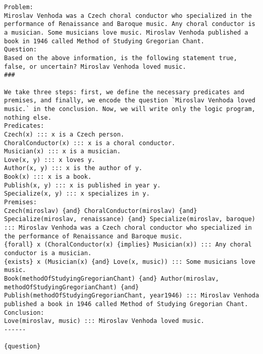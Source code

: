 \begin{lstlisting}[style=myGrammarStyle, caption=Prompt Template Used For FOLIO Evaluation]
Problem:
Miroslav Venhoda was a Czech choral conductor who specialized in the performance of Renaissance and Baroque music. Any choral conductor is a musician. Some musicians love music. Miroslav Venhoda published a book in 1946 called Method of Studying Gregorian Chant.
Question:
Based on the above information, is the following statement true, false, or uncertain? Miroslav Venhoda loved music.
###

We take three steps: first, we define the necessary predicates and premises, and finally, we encode the question `Miroslav Venhoda loved music.` in the conclusion. Now, we will write only the logic program, nothing else.
Predicates:
Czech(x) ::: x is a Czech person.
ChoralConductor(x) ::: x is a choral conductor.
Musician(x) ::: x is a musician.
Love(x, y) ::: x loves y.
Author(x, y) ::: x is the author of y.
Book(x) ::: x is a book.
Publish(x, y) ::: x is published in year y.
Specialize(x, y) ::: x specializes in y.
Premises:
Czech(miroslav) {and} ChoralConductor(miroslav) {and} Specialize(miroslav, renaissance) {and} Specialize(miroslav, baroque) ::: Miroslav Venhoda was a Czech choral conductor who specialized in the performance of Renaissance and Baroque music.
{forall} x (ChoralConductor(x) {implies} Musician(x)) ::: Any choral conductor is a musician.
{exists} x (Musician(x) {and} Love(x, music)) ::: Some musicians love music.
Book(methodOfStudyingGregorianChant) {and} Author(miroslav, methodOfStudyingGregorianChant) {and} Publish(methodOfStudyingGregorianChant, year1946) ::: Miroslav Venhoda published a book in 1946 called Method of Studying Gregorian Chant.
Conclusion:
Love(miroslav, music) ::: Miroslav Venhoda loved music.
------

{question}
\end{lstlisting}
\label{gram:folio_prompt}